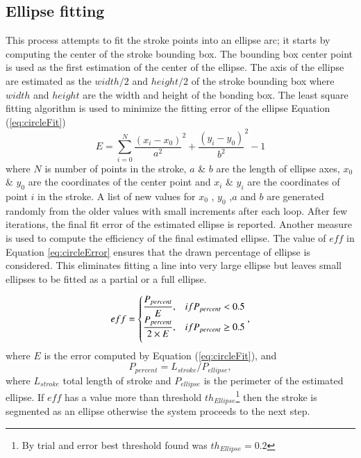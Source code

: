 \documentclass[preprint,10pt,5p,twocolumn]{elsarticle}
\begin{document}
 
\subsection{Ellipse fitting}
 
This process attempts to fit the stroke points into an ellipse arc; it starts by computing the center of the stroke bounding box. The bounding box center point is used as the first estimation of the center of the ellipse. The axis of the ellipse are estimated as the $width/2$ and $height/2$ of the stroke bounding box where $width$ and $height$ are the width and height of the bonding box. The least square fitting algorithm \cite{chernov} is used to minimize the fitting error of the ellipse Equation (\ref{eq:circleFit})  
\begin{equation}
E = \sum\limits_{i = 0}^N {\frac{{(x_i - x_0 )}}{{a^2 }}^2  + \frac{{(y_i - y_0 )}}{{b^2 }}^2  - 1} 
\label{eq:circleFit}
\end{equation}
where $N$ is number of points in the stroke, $a$ \& $b$ are the length of ellipse axes, $x_0$ \& $y_0$ are the coordinates of the center point and $x_i$ \& $y_i$ are the coordinates of point $i$ in the stroke. A list of new values for $x_0$ , $y_0$ ,$a$ and $b$ are generated randomly from the older values with small increments after each loop.  After few iterations, the final fit error of the estimated ellipse is reported. Another measure is used to compute the efficiency of the final estimated ellipse. The value of $eff$ in Equation \ref{eq:circleError} ensures that the drawn percentage of ellipse is considered. This eliminates fitting a line into very large ellipse but leaves small ellipses to be fitted as a partial or a full ellipse. 

 \begin{equation}
 eff= \begin{cases} 
\displaystyle \frac{P_{percent}}{E},&if P_{percent}< 0.5 \\ \medskip
\displaystyle  \frac{P_{percent}}{2\times E},&if P_{percent}\geq 0.5 \\
 
\end{cases},
\label{eq:circleError}
\end{equation}
 where $E$ is the error computed by Equation (\ref{eq:circleFit}), and 
\[
P_{percent}  = L_{stroke} /P_{ellipse}, 
\]
 where $L_{stroke}$ total length of stroke and $P_{ellipse} $ is the perimeter of the estimated ellipse. If $eff$ has a value more than threshold $th_{Ellipse}$\footnote{By trial and error best threshold found was $th_{Ellipse}=0.2$} then the stroke is segmented as an ellipse otherwise the system proceeds to the next step. 
\end{document}
